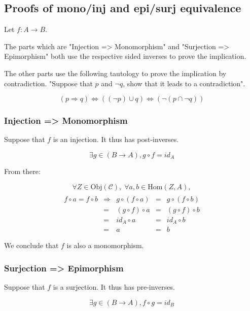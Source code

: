 \subsection*{Proofs of mono/inj and epi/surj equivalence}

Let $f : A \to B$.

The parts which are "Injection => Monomorphism" and "Surjection => Epimorphism" both use the respective sided inverses to prove the implication.

The other parts use the following tautology to prove the implication by contradiction. "Suppose that $p$ and $\neg q$, show that it leads to a contradiction".

$$
(p \Rightarrow q)
\Leftrightarrow ((\neg  p) \cup      q )
\Leftrightarrow ( \neg (p  \cap \neg q))
$$


\subsubsection*{Injection => Monomorphism}

Suppose that $f$ is an injection. It thus has post-inverses.

$$\exists g \in (B \to A), g \circ f = id_A$$

From there:

$$
\forall Z \in \text{Obj}(\mathcal{C}), \;
\forall a, b \in \text{Hom}(Z, A),
$$
$$
\begin{array}{ccccc} \\
f \circ a = f \circ b & \Rightarrow &  g \circ (f  \circ a) &=&  g \circ (f  \circ b) \\
                      & =           & (g \circ  f) \circ a  &=& (g \circ  f) \circ b  \\
                      & =           &         id_A \circ a  &=&         id_A \circ b  \\
                      & =           &                    a  &=&                    b
\end{array}
$$

We conclude that $f$ is also a monomorphism.


\subsubsection*{Surjection => Epimorphism}

Suppose that $f$ is a surjection. It thus has pre-inverses.

$$\exists g \in (B \to A), f \circ g = id_B$$


